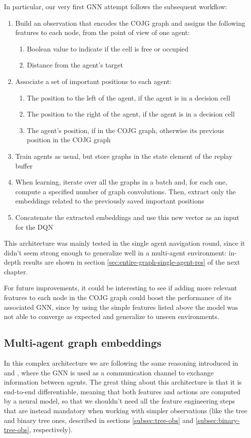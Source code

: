 \documentclass[a4paper,10pt]{report}
\begin{document}
In particular, our very first GNN attempt follows the subsequent workflow:
\begin{enumerate}
	\item Build an observation that encodes the COJG graph and assigns the following features to each node, from the point of view of one agent:
	\begin{enumerate}
		\item Boolean value to indicate if the cell is free or occupied
		\item Distance from the agent's target
	\end{enumerate}
	\item Associate a set of important positions to each agent:
	\begin{enumerate}
		\item The position to the left of the agent, if the agent is in a decision cell
		\item The position to the right of the agent, if the agent is in a decision cell
		\item The agent's position, if in the COJG graph, otherwise its previous position in the COJG graph
	\end{enumerate}
	\item Train agents as usual, but store graphs in the state element of the replay buffer
	\item When learning, iterate over all the graphs in a batch and, for each one, compute a specified number of graph convolutions. Then, extract only the embeddings related to the previously saved important positions
	\item Concatenate the extracted embeddings and use this new vector as an input for the DQN
\end{enumerate}

This architecture was mainly tested in the single agent navigation round, since it didn't seem strong enough to generalize well in a multi-agent environment: in-depth results are shown in section \ref{sec:entire-graph-single-agent-res} of the next chapter.

For future improvements, it could be interesting to see if adding more relevant features to each node in the COJG graph could boost the performance of its associated GNN, since by using the simple features listed above the model was not able to converge as expected and generalize to unseen environments. 

\subsection{Multi-agent graph embeddings}\label{subsec:multi-agent-gnn}
In this complex architecture we are following the same reasoning introduced in \cite{dqn-gnn-robot} and \cite{magat}, where the GNN is used as a communication channel to exchange information between agents. The great thing about this architecture is that it is end-to-end differentiable, meaning that both features and actions are computed by a neural model, so that we shouldn't need all the feature engineering steps that are instead mandatory when working with simpler observations (like the tree and binary tree ones, described in sections \ref{subsec:tree-obs} and \ref{subsec:binary-tree-obs}, respectively).
\end{document}
